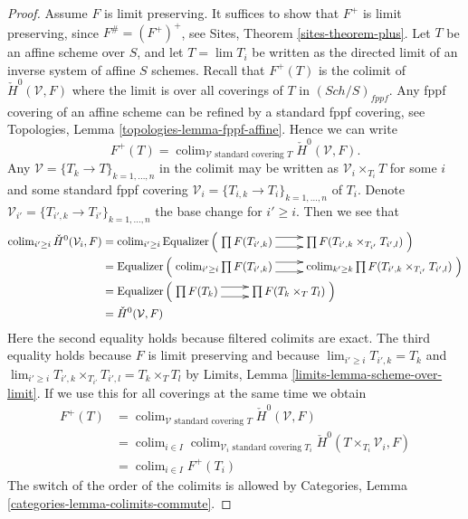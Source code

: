 \documentclass{stacks-project}
\theoremstyle{plain}
\theoremstyle{definition}
\theoremstyle{remark}
\numberwithin{equation}{subsection}
\def\lim{\mathop{\mathrm{lim}}\nolimits}
\def\colim{\mathop{\mathrm{colim}}\nolimits}
\def\Sch{\mathit{Sch}}
\begin{document}
\begin{proof}
Assume $F$ is limit preserving.
It suffices to show that $F^+$ is limit preserving, since
$F^\# = (F^+)^+$, see
Sites, Theorem \ref{sites-theorem-plus}.
Let $T$ be an affine scheme over $S$, and let $T = \lim T_i$ be written
as the directed limit of an inverse system of affine $S$ schemes.
Recall that $F^+(T)$ is the colimit of $\check H^0(\mathcal{V}, F)$
where the limit is over all coverings of $T$ in $(\Sch/S)_{fppf}$.
Any fppf covering of an affine scheme can be refined by a standard
fppf covering, see
Topologies, Lemma \ref{topologies-lemma-fppf-affine}.
Hence we can write
$$
F^+(T)
=
\colim_{\mathcal{V}\text{ standard covering }T}
\check H^0(\mathcal{V}, F).
$$
Any $\mathcal{V} = \{T_k \to T\}_{k = 1, \ldots, n}$
in the colimit may be written as
$\mathcal{V}_i \times_{T_i} T$ for some $i$ and some standard fppf covering
$\mathcal{V}_i = \{T_{i, k} \to T_i\}_{k = 1, \ldots, n}$ of $T_i$.
Denote $\mathcal{V}_{i'} = \{T_{i', k} \to T_{i'}\}_{k = 1, \ldots, n}$
the base change for $i' \geq i$. Then we see that
\begin{align*}
\colim_{i' \geq i} \check H^0(\mathcal{V}_i, F)
& =
\colim_{i' \geq i}
\text{Equalizer}
\left(
\xymatrix{
\prod F(T_{i', k})
\ar@<1ex>[r] \ar@<-1ex>[r] &
\prod F(T_{i', k} \times_{T_{i'}} T_{i', l})
}
\right)
\\
& =
\text{Equalizer}
\left(
\xymatrix{
\colim_{i' \geq i}
\prod F(T_{i', k})
\ar@<1ex>[r] \ar@<-1ex>[r] &
\colim_{k' \geq k}
\prod F(T_{i', k} \times_{T_{i'}} T_{i', l})
}
\right)
\\
& =
\text{Equalizer}
\left(
\xymatrix{
\prod F(T_k)
\ar@<1ex>[r] \ar@<-1ex>[r] &
\prod F(T_k \times_T T_l)
}
\right)
\\
& =
\check H^0(\mathcal{V}, F)
\end{align*}
Here the second equality holds because filtered colimits are exact.
The third equality holds because $F$ is limit preserving and because
$\lim_{i' \geq i} T_{i', k} = T_k$ and
$\lim_{i' \geq i} T_{i', k} \times_{T_{i'}} T_{i', l} = T_k \times_T T_l$
by Limits, Lemma \ref{limits-lemma-scheme-over-limit}.
If we use this for all coverings at the same time we obtain
\begin{align*}
F^+(T)
& =
\colim_{\mathcal{V}\text{ standard covering }T} \check H^0(\mathcal{V}, F) \\
& =
\colim_{i \in I}
\colim_{\mathcal{V}_i\text{ standard covering }T_i}
\check H^0(T \times_{T_i}\mathcal{V}_i, F) \\
& =
\colim_{i \in I} F^+(T_i)
\end{align*}
The switch of the order of the colimits is allowed by
Categories, Lemma \ref{categories-lemma-colimits-commute}.
\end{proof}
\end{document}
